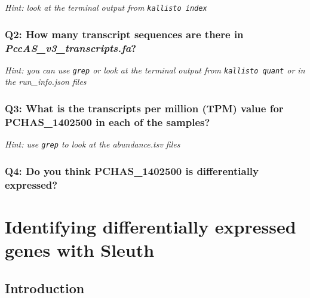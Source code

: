 \documentclass[11pt]{article}
\begin{document}
\textit{Hint: look at the terminal output from \texttt{kallisto\ index}}

\hypertarget{q2-how-many-transcript-sequences-are-there-in-pccas_v3_transcripts.fa}{%
\subsubsection{\texorpdfstring{Q2: How many transcript sequences are
there in
\textit{PccAS\_v3\_transcripts.fa}?}{Q2: How many transcript sequences are there in PccAS\_v3\_transcripts.fa?}}\label{q2-how-many-transcript-sequences-are-there-in-pccas_v3_transcripts.fa}}

\textit{Hint: you can use \texttt{grep} or look at the terminal output
from \texttt{kallisto\ quant} or in the run\_info.json files}

\hypertarget{q3-what-is-the-transcripts-per-million-tpm-value-for-pchas_1402500-in-each-of-the-samples}{%
\subsubsection{Q3: What is the transcripts per million (TPM) value for
PCHAS\_1402500 in each of the
samples?}\label{q3-what-is-the-transcripts-per-million-tpm-value-for-pchas_1402500-in-each-of-the-samples}}

\textit{Hint: use \texttt{grep} to look at the abundance.tsv files}

\hypertarget{q4-do-you-think-pchas_1402500-is-differentially-expressed}{%
\subsubsection{Q4: Do you think PCHAS\_1402500 is differentially
expressed?}\label{q4-do-you-think-pchas_1402500-is-differentially-expressed}}




\newpage

    \hypertarget{identifying-differentially-expressed-genes-with-sleuth}{%
\section{Identifying differentially expressed genes with
Sleuth}\label{identifying-differentially-expressed-genes-with-sleuth}}

    \hypertarget{introduction}{%
\subsection{Introduction}\label{introduction}}
\end{document}
